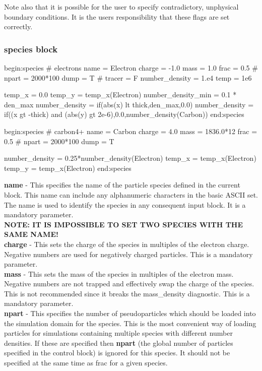 \documentclass[12pt,a4paper]{article}
\newcommand{\emphtext}{\color{warwickdark} \fontfamily{phv}\selectfont\large\bf}
\newcommand{\inlineemph}[1]{{\color{warwicklight} \bf{#1}}}
\newenvironment{lboxverbatim}[1]{
\setlength{\FrameSep}{0pt}
\def\FrameCommand{\fboxsep=0pt \colorbox{shadecolor}}
\MakeFramed{\FrameRestore}
\vspace{-13.5pt}
\fvset{label=#1}
\boxverb
}{
\endboxverb
\vspace{-13.5pt}
\endMakeFramed
}
\begin{document}
Note also that it is possible for the user to specify contradictory,
unphysical boundary conditions. It is the users responsibility that these
flags are set correctly.

\subsubsection{\inlineemph{species} block}

\begin{lboxverbatim}{species block}
begin:species
   # electrons
   name = Electron
   charge = -1.0
   mass = 1.0
   frac = 0.5
   # npart = 2000*100
   dump = T
   # tracer = F
   number_density = 1.e4
   temp = 1e6

   temp_x = 0.0
   temp_y = temp_x(Electron)
   number_density_min = 0.1 * den_max
   number_density = if(abs(x) lt thick,den_max,0.0)
   number_density = if((x gt -thick) and (abs(y) gt 2e-6),0.0,number_density(Carbon))
end:species

begin:species
   # carbon4+
   name = Carbon
   charge = 4.0
   mass = 1836.0*12
   frac = 0.5
   # npart = 2000*100
   dump = T

   number_density = 0.25*number_density(Electron)
   temp_x = temp_x(Electron)
   temp_y = temp_x(Electron)
end:species
\end{lboxverbatim}

{\emphtext name} - This specifies the name of the particle species defined
in the current block. This name can include any alphanumeric characters in
the basic ASCII set. The name is used to identify the species in any
consequent input block. It is a mandatory parameter.\\

{\emphtext NOTE: IT IS IMPOSSIBLE TO SET TWO SPECIES WITH THE SAME NAME!} \\

{\emphtext charge} - This sets the charge of the species in
multiples of the electron charge. Negative numbers are used for negatively
charged particles. This is a mandatory parameter.\\

{\emphtext mass} - This sets the mass of the species in multiples
of the electron mass. Negative numbers are not trapped and effectively swap the
charge of the species. This is not recommended since it breaks the
mass\_density diagnostic. This is a mandatory parameter.\\

{\emphtext npart} - This specifies the number of pseudoparticles
which should be loaded into the simulation domain for the species. This is the
most convenient way of loading particles for simulations containing multiple
species with different number densities. If these are specified then
\inlineemph{npart} (the global number of particles specified in the control
block) is ignored for this species. It should not be specified at the same time
as frac for a given species.\\
\end{document}
